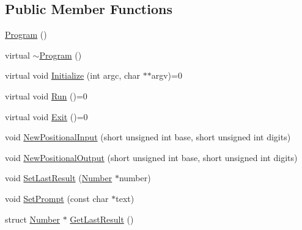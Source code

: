 \subsection*{Public Member Functions}
\begin{DoxyCompactItemize}
\item 
\hyperlink{classProgram_aaefaa0df08f3484476fc4d61e97acbdc}{Program} ()
\item 
virtual \hyperlink{classProgram_a986aef1c50e1d338a3315a47ba6df549}{$\sim$\+Program} ()
\item 
virtual void \hyperlink{classProgram_a6c8e48e064937d9c71168ed3a15ccf13}{Initialize} (int argc, char $\ast$$\ast$argv)=0
\item 
virtual void \hyperlink{classProgram_a466c115e35933f7fb3a3775bc8f20ac4}{Run} ()=0
\item 
virtual void \hyperlink{classProgram_adf53af02e6c4719ec0f019f0d305f80e}{Exit} ()=0
\item 
void \hyperlink{classProgram_aef8e1c957776e550081cb2c47a11d64b}{New\+Positional\+Input} (short unsigned int base, short unsigned int digits)
\item 
void \hyperlink{classProgram_a38a8a4a116b01a1bce417488ee235ee7}{New\+Positional\+Output} (short unsigned int base, short unsigned int digits)
\item 
void \hyperlink{classProgram_ad54464237ceca1f54a46c2223cfbcda0}{Set\+Last\+Result} (\hyperlink{structNumber}{Number} $\ast$number)
\item 
void \hyperlink{classProgram_a517c5f08c0c0dd7f79de6fbf0e62aac6}{Set\+Prompt} (const char $\ast$text)
\item 
struct \hyperlink{structNumber}{Number} $\ast$ \hyperlink{classProgram_a17fa68f9eb4bb5d0cd72b26dc6a381f5}{Get\+Last\+Result} ()
\end{DoxyCompactItemize}
